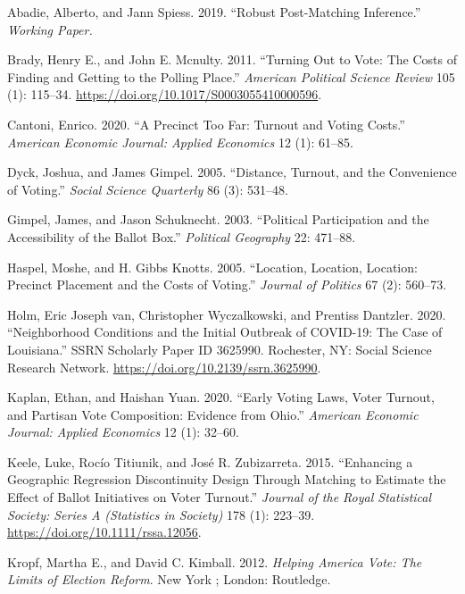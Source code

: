 \documentclass[
  12pt,
]{article}
\newlength{\cslhangindent}
\newenvironment{cslreferences}%
  {\setlength{\parindent}{0pt}%
  \everypar{\setlength{\hangindent}{\cslhangindent}}\ignorespaces}%
  {\par}
\begin{document}
\hypertarget{refs}{}
\begin{cslreferences}
\leavevmode\hypertarget{ref-Abadie2019}{}%
Abadie, Alberto, and Jann Spiess. 2019. ``Robust Post-Matching Inference.'' \emph{Working Paper.}

\leavevmode\hypertarget{ref-Brady2011}{}%
Brady, Henry E., and John E. Mcnulty. 2011. ``Turning Out to Vote: The Costs of Finding and Getting to the Polling Place.'' \emph{American Political Science Review} 105 (1): 115--34. \url{https://doi.org/10.1017/S0003055410000596}.

\leavevmode\hypertarget{ref-Cantoni2020}{}%
Cantoni, Enrico. 2020. ``A Precinct Too Far: Turnout and Voting Costs.'' \emph{American Economic Journal: Applied Economics} 12 (1): 61--85.

\leavevmode\hypertarget{ref-Dyck2005}{}%
Dyck, Joshua, and James Gimpel. 2005. ``Distance, Turnout, and the Convenience of Voting.'' \emph{Social Science Quarterly} 86 (3): 531--48.

\leavevmode\hypertarget{ref-Gimpel2003}{}%
Gimpel, James, and Jason Schuknecht. 2003. ``Political Participation and the Accessibility of the Ballot Box.'' \emph{Political Geography} 22: 471--88.

\leavevmode\hypertarget{ref-Haspel2005}{}%
Haspel, Moshe, and H. Gibbs Knotts. 2005. ``Location, Location, Location: Precinct Placement and the Costs of Voting.'' \emph{Journal of Politics} 67 (2): 560--73.

\leavevmode\hypertarget{ref-vanHolm2020}{}%
Holm, Eric Joseph van, Christopher Wyczalkowski, and Prentiss Dantzler. 2020. ``Neighborhood Conditions and the Initial Outbreak of COVID-19: The Case of Louisiana.'' SSRN Scholarly Paper ID 3625990. Rochester, NY: Social Science Research Network. \url{https://doi.org/10.2139/ssrn.3625990}.

\leavevmode\hypertarget{ref-Kaplan2020}{}%
Kaplan, Ethan, and Haishan Yuan. 2020. ``Early Voting Laws, Voter Turnout, and Partisan Vote Composition: Evidence from Ohio.'' \emph{American Economic Journal: Applied Economics} 12 (1): 32--60.

\leavevmode\hypertarget{ref-Keele2015}{}%
Keele, Luke, Rocío Titiunik, and José R. Zubizarreta. 2015. ``Enhancing a Geographic Regression Discontinuity Design Through Matching to Estimate the Effect of Ballot Initiatives on Voter Turnout.'' \emph{Journal of the Royal Statistical Society: Series A (Statistics in Society)} 178 (1): 223--39. \url{https://doi.org/10.1111/rssa.12056}.

\leavevmode\hypertarget{ref-Kropf2012}{}%
Kropf, Martha E., and David C. Kimball. 2012. \emph{Helping America Vote: The Limits of Election Reform}. New York ; London: Routledge.


\end{cslreferences}
\end{document}
